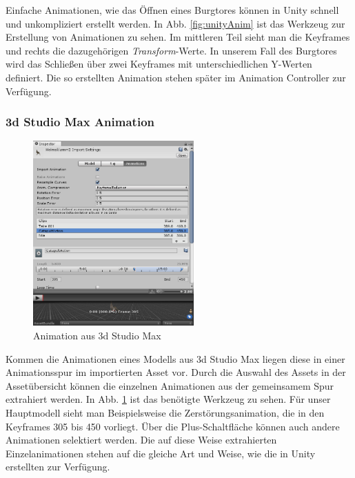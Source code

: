 Einfache Animationen, wie das Öffnen eines Burgtores können in Unity schnell und unkompliziert erstellt werden. In Abb. \ref{fig:unityAnim} ist das Werkzeug zur Erstellung von Animationen zu sehen. Im mittleren Teil sieht man die Keyframes und rechts die dazugehörigen \textit{Transform}-Werte. In unserem Fall des Burgtores wird das Schließen über zwei Keyframes mit unterschiedlichen Y-Werten definiert. Die so erstellten Animation stehen später im Animation Controller zur Verfügung.

\subsubsection{3d Studio Max Animation}

\begin{figure}
	\begin{center}
		\includegraphics[width=0.55\textwidth]{Abbildungen/Unity/3dsAnim}
	\end{center}
	\caption{Animation aus 3d Studio Max}
	\label{fig:3dsAnim}
\end{figure}

Kommen die Animationen eines Modells aus 3d Studio Max liegen diese in einer Animationsspur im importierten Asset vor. Durch die Auswahl des Assets in der Assetübersicht können die einzelnen Animationen aus der gemeinsamem Spur extrahiert werden. In Abb. \ref{fig:3dsAnim} ist das benötigte Werkzeug zu sehen. Für unser Hauptmodell sieht man Beispielsweise die Zerstörungsanimation, die in den Keyframes 305 bis 450 vorliegt. Über die Plus-Schaltfläche können auch andere Animationen selektiert werden. Die auf diese Weise extrahierten Einzelanimationen stehen auf die gleiche Art und Weise, wie die in Unity erstellten zur Verfügung.  

